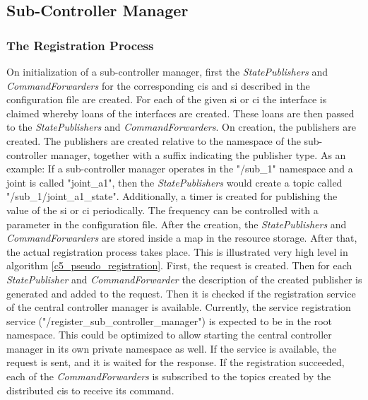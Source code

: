 \subsection{Sub-Controller Manager}
\subsubsection{The Registration Process}\label{c5_registration_sub_controller}
On initialization of a sub-controller manager, first the \textit{StatePublishers} and \textit{CommandForwarders} for the corresponding \glspl{ci} and \gls{si} described in the configuration file are created. For each of the given \gls{si} or \gls{ci} the interface is claimed whereby loans of the interfaces are created. These loans are then passed to the \textit{StatePublishers} and \textit{CommandForwarders}. On creation, the publishers are created. The publishers are created relative to the namespace of the sub-controller manager, together with a suffix indicating the publisher type. As an example: If a sub-controller manager operates in the "/sub\_1" namespace and a joint is called "joint\_a1", then the \textit{StatePublishers} would create a topic called "/sub\_1/joint\_a1\_state".\newline
Additionally, a timer is created for publishing the value of the \gls{si} or \gls{ci} periodically. The frequency can be controlled with a parameter in the configuration file. After the creation, the \textit{StatePublishers} and \textit{CommandForwarders} are stored inside a map in the resource storage. \newline
After that, the actual registration process takes place. This is illustrated very high level in algorithm \autoref{c5_pseudo_registration}. First, the request is created. Then for each \textit{StatePublisher} and \textit{CommandForwarder} the description of the created publisher is generated and added to the request. Then it is checked if the registration service of the central controller manager is available. Currently, the service registration service ("/register\_sub\_controller\_manager") is expected to be in the root namespace. This could be optimized to allow starting the central controller manager in its own private namespace as well. If the service is available, the request is sent, and it is waited for the response. If the registration succeeded, each of the \textit{CommandForwarders} is subscribed to the topics created by the distributed \glspl{ci} to receive its command.
